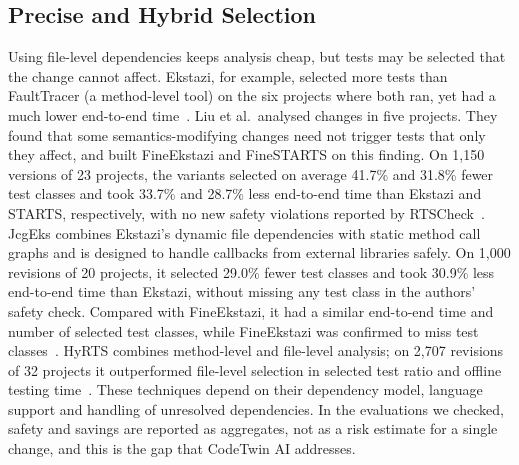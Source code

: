 \documentclass[conference]{IEEEtran}
\begin{document}
\subsection{Precise and Hybrid Selection}
Using file-level dependencies keeps analysis cheap, but tests may be selected that the change cannot affect. Ekstazi, for example, selected more tests than FaultTracer (a method-level tool) on the six projects where both ran, yet had a much lower end-to-end time~\cite{gligoric2015ekstazi}. Liu et al.\ analysed changes in five projects. They found that some semantics-modifying changes need not trigger tests that only they affect, and built FineEkstazi and FineSTARTS on this finding. On 1,150 versions of 23 projects, the variants selected on average 41.7\% and 31.8\% fewer test classes and took 33.7\% and 28.7\% less end-to-end time than Ekstazi and STARTS, respectively, with no new safety violations reported by RTSCheck~\cite{liu2023finerts}. JcgEks combines Ekstazi's dynamic file dependencies with static method call graphs and is designed to handle callbacks from external libraries safely. On 1,000 revisions of 20 projects, it selected 29.0\% fewer test classes and took 30.9\% less end-to-end time than Ekstazi, without missing any test class in the authors' safety check. Compared with FineEkstazi, it had a similar end-to-end time and number of selected test classes, while FineEkstazi was confirmed to miss test classes~\cite{zhang2024jcgeks}. HyRTS combines method-level and file-level analysis; on 2,707 revisions of 32 projects it outperformed file-level selection in selected test ratio and offline testing time~\cite{zhang2018hyrts}. These techniques depend on their dependency model, language support and handling of unresolved dependencies. In the evaluations we checked, safety and savings are reported as aggregates, not as a risk estimate for a single change, and this is the gap that CodeTwin AI addresses.
\end{document}
